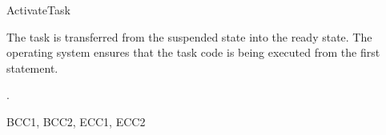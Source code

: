 \documentclass[12pt,a4paper,titlepage]{scrreprt}
\begin{document}
\begin{function}{ActivateTask}


  \begin{fundescription}
    The task  is transferred from the suspended state into the
    ready state. The operating system ensures that the task code is being
    executed from the first statement.
  \end{fundescription}

  \begin{funparameters}
  \end{funparameters}

  \begin{funreturn}
  .
  \end{funreturn}

  \begin{funconformance}
    BCC1, BCC2, ECC1, ECC2
  \end{funconformance}
\end{function}
\end{document}
